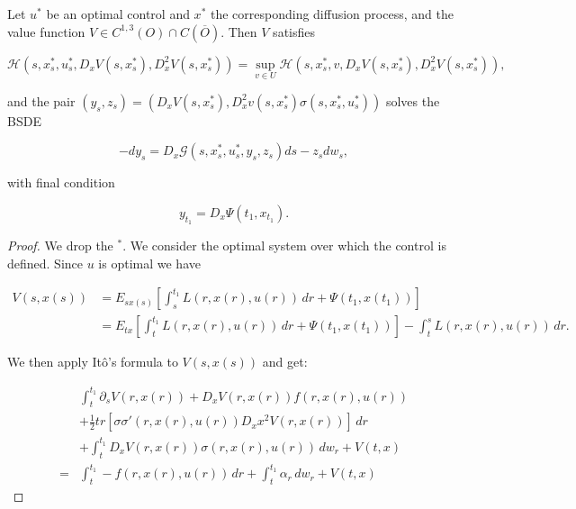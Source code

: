 \begin{theorem}\label{2-3-stochmaxprinc}
    Let $u^{\ast}$ be an optimal control and $x^{\ast}$ the corresponding diffusion process, and the value function 
    $V\in C^{1,3}(O)\cap C(\overline{O})$. Then $V$ satisfies
    
    \begin{equation}\label{2-3-maxcond}
        \mathcal{H}(s,x_s^{\ast}, u_s^{\ast}, D_xV(s,x^{\ast}_s), D_x^2V(s,x^{\ast}_s)) = \sup_{v \in U}\mathcal{H}(s,x_s^{\ast}, v, D_xV(s,x^{\ast}_s), D_x^2V(s,x^{\ast}_s)),
    \end{equation}

    and the pair $(y_s,z_s)=\left(D_xV(s,x_s^{\ast}),D_x^2v(s,x_s^{\ast})\sigma(s,x_s^{\ast},u_s^{\ast})\right)$ solves the BSDE

    \begin{equation}\label{2-3-maxprinc-BSDE}
        -dy_s = D_x\mathcal{G}(s,x_s^{\ast}, u_s^{\ast}, y_s, z_s)ds - z_sdw_s,
    \end{equation}

    with final condition

    \begin{equation}\label{2-3-maxprinc-finalcond}
        y_{t_1} = D_x\Psi(t_1,x_{t_1}).
    \end{equation}

    \begin{proof}
        We drop the $^{\ast}$. We consider the optimal system over which the control is defined. 
        Since $u$ is optimal we have

        \begin{align*}
            V(s,x(s)) & = E_{sx(s)}\left[\int_s^{t_1} L(r,x(r),u(r))\,dr + \Psi(t_1,x(t_1))\right] \\ 
            & = E_{tx}\left[\int_t^{t_1} L(r,x(r),u(r))\,dr + \Psi(t_1,x(t_1))\right] - \int_t^s L(r,x(r),u(r))\,dr.  
        \end{align*}

        We then apply It\^o's formula to $V(s,x(s))$ and get:

        \begin{equation}\label{Ito to V BSDE}
            \begin{aligned}
                & \int_t^{t_1} \partial_sV(r,x(r)) + D_xV(r,x(r))f(r,x(r),u(r)) \\
                & + \frac{1}{2}tr\left[\sigma\sigma'(r,x(r),u(r))D_xx^2V(r,x(r))\right] \,dr \\
                & + \int_t^{t_1} D_xV(r,x(r))\sigma(r,x(r),u(r))\,dw_r + V(t,x) \\
                = & \int_t^{t_1} - f(r,x(r),u(r))\,dr + \int_t^{t_1}\alpha_r\,dw_r + V(t,x)
            \end{aligned}
        \end{equation}


\end{proof}
\end{theorem}
